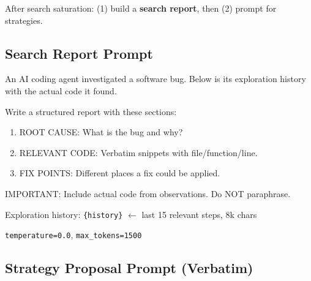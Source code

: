 \documentclass[10pt,a4paper,twocolumn]{article}
\begin{document}
After search saturation: (1) build a \textbf{search report}, then (2) prompt for strategies.

\subsection{Search Report Prompt}

\begin{promptbox}[title=Search Report Prompt]
\scriptsize
An AI coding agent investigated a software bug. Below is its exploration history with the actual code it found.

Write a structured report with these sections:
\begin{enumerate}[nosep,leftmargin=10pt]
\item ROOT CAUSE: What is the bug and why?
\item RELEVANT CODE: Verbatim snippets with file/function/line.
\item FIX POINTS: Different places a fix could be applied.
\end{enumerate}

IMPORTANT: Include actual code from observations. Do NOT paraphrase.

Exploration history: \texttt{\{history\}} {\color{gray}$\leftarrow$ last 15 relevant steps, 8k chars}
\end{promptbox}

\begin{small}
\texttt{temperature=0.0}, \texttt{max\_tokens=1500}
\end{small}

\subsection{Strategy Proposal Prompt (Verbatim)}
\end{document}

